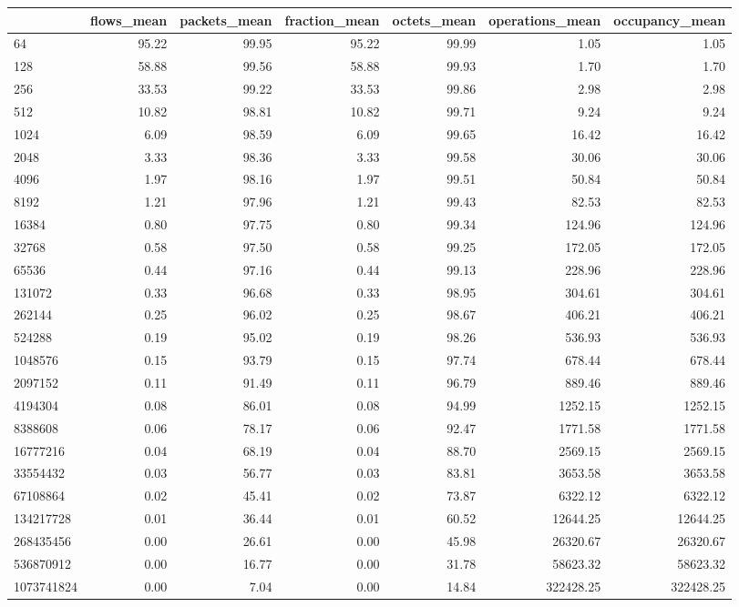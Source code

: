 \begin{tabular}{lrrrrrr}
\toprule
 & flows_mean & packets_mean & fraction_mean & octets_mean & operations_mean & occupancy_mean \\
\midrule
64 & 95.22 & 99.95 & 95.22 & 99.99 & 1.05 & 1.05 \\
128 & 58.88 & 99.56 & 58.88 & 99.93 & 1.70 & 1.70 \\
256 & 33.53 & 99.22 & 33.53 & 99.86 & 2.98 & 2.98 \\
512 & 10.82 & 98.81 & 10.82 & 99.71 & 9.24 & 9.24 \\
1024 & 6.09 & 98.59 & 6.09 & 99.65 & 16.42 & 16.42 \\
2048 & 3.33 & 98.36 & 3.33 & 99.58 & 30.06 & 30.06 \\
4096 & 1.97 & 98.16 & 1.97 & 99.51 & 50.84 & 50.84 \\
8192 & 1.21 & 97.96 & 1.21 & 99.43 & 82.53 & 82.53 \\
16384 & 0.80 & 97.75 & 0.80 & 99.34 & 124.96 & 124.96 \\
32768 & 0.58 & 97.50 & 0.58 & 99.25 & 172.05 & 172.05 \\
65536 & 0.44 & 97.16 & 0.44 & 99.13 & 228.96 & 228.96 \\
131072 & 0.33 & 96.68 & 0.33 & 98.95 & 304.61 & 304.61 \\
262144 & 0.25 & 96.02 & 0.25 & 98.67 & 406.21 & 406.21 \\
524288 & 0.19 & 95.02 & 0.19 & 98.26 & 536.93 & 536.93 \\
1048576 & 0.15 & 93.79 & 0.15 & 97.74 & 678.44 & 678.44 \\
2097152 & 0.11 & 91.49 & 0.11 & 96.79 & 889.46 & 889.46 \\
4194304 & 0.08 & 86.01 & 0.08 & 94.99 & 1252.15 & 1252.15 \\
8388608 & 0.06 & 78.17 & 0.06 & 92.47 & 1771.58 & 1771.58 \\
16777216 & 0.04 & 68.19 & 0.04 & 88.70 & 2569.15 & 2569.15 \\
33554432 & 0.03 & 56.77 & 0.03 & 83.81 & 3653.58 & 3653.58 \\
67108864 & 0.02 & 45.41 & 0.02 & 73.87 & 6322.12 & 6322.12 \\
134217728 & 0.01 & 36.44 & 0.01 & 60.52 & 12644.25 & 12644.25 \\
268435456 & 0.00 & 26.61 & 0.00 & 45.98 & 26320.67 & 26320.67 \\
536870912 & 0.00 & 16.77 & 0.00 & 31.78 & 58623.32 & 58623.32 \\
1073741824 & 0.00 & 7.04 & 0.00 & 14.84 & 322428.25 & 322428.25 \\
\bottomrule
\end{tabular}
